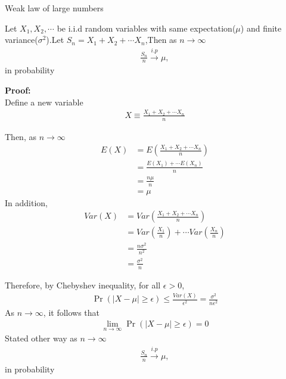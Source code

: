 \documentclass{beamer}
\providecommand{\pr}[1]{\ensuremath{\Pr\left(#1\right)}}
\begin{document}
\begin{frame}
\frametitle{}
\begin{block}{Weak law of large numbers}

Let $X_1,X_2,\cdots $ be i.i.d random variables with same expectation($\mu$) and finite variance($\sigma^2$).Let $S_{n}=X_1+X_2+\cdots X_n$,Then as $n \to \infty$
\begin{align}
    \frac{S_n}{n} \xrightarrow{i.p}  \mu,
\end{align}
in probability
\end{block}
\textbf{Proof:}\\
Define a new variable
\begin{align}
    X \equiv \frac{X_1+X_2+\cdots X_n}{n}
\end{align}
\end{frame}
\begin{frame}

Then, as $n \to \infty$
\begin{align}
    E(X)&=E\left(\frac{X_1+X_2+\cdots X_n}{n}\right)\\
    &=\frac{E(X_1)+\cdots E(X_n)}{n}\\
    &=\frac{n \mu}{n}\\
    &=\mu
\end{align}
In addition,
\begin{align}
    Var(X)&=Var\left(\frac{X_1+X_2+\cdots X_n}{n}\right)\\
    &=Var\left(\frac{X_1}{n}\right)+\cdots Var\left(\frac{X_n}{n}\right)\\
    &=\frac{n\sigma^2}{n^2}\\
    &=\frac{\sigma^2}{n}
\end{align}
\end{frame}
\begin{frame}
Therefore, by Chebyshev inequality, for all $\epsilon>0$,
\begin{align}
   \pr{|X-\mu| \geq \epsilon} \leq \frac{Var(X)}{\epsilon^2}=\frac{\sigma^2}{n\epsilon^2}   
\end{align}
As $n \to \infty$, it follows that
\begin{align}
    \lim_{n \to \infty} \pr{|X-\mu| \geq \epsilon}=0
\end{align}
Stated other way as $n \to \infty$
\begin{align}
    \frac{S_n}{n} \xrightarrow{i.p}  \mu,
\end{align}
in probability


\end{frame}
\end{document}
